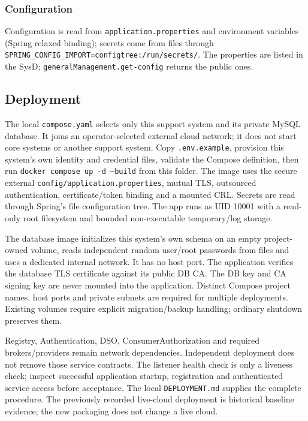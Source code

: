 \documentclass[a4paper]{arrowhead}
\begin{document}
\subsubsection{Configuration}

Configuration is read from \texttt{application.\allowbreak{}properties} and environment variables (Spring relaxed binding); secrets come from files through \texttt{SPRING\_\allowbreak{}CONFIG\_\allowbreak{}IMPORT=\allowbreak{}configtree:\allowbreak{}/\allowbreak{}run/\allowbreak{}secrets/\allowbreak{}}. The properties are listed in the SysD; \texttt{general\allowbreak{}Management.\allowbreak{}get-\allowbreak{}config} returns the public ones.

\subsection{Deployment}

The local \texttt{compose.yaml} selects only this support system and its private MySQL database. It joins an operator-selected external cloud network; it does not start core systems or another support system. Copy \texttt{.env.example}, provision this system's own identity and credential files, validate the Compose definition, then run \texttt{docker compose up -d --build} from this folder. The image uses the secure external \texttt{config/application.properties}, mutual TLS, outsourced authentication, certificate/token binding and a mounted CRL. Secrets are read through Spring's file configuration tree. The app runs as UID 10001 with a read-only root filesystem and bounded non-executable temporary/log storage.

The database image initializes this system's own schema on an empty project-owned volume, reads independent random user/root passwords from files and uses a dedicated internal network. It has no host port. The application verifies the database TLS certificate against its public DB CA. The DB key and CA signing key are never mounted into the application. Distinct Compose project names, host ports and private subnets are required for multiple deployments. Existing volumes require explicit migration/backup handling; ordinary shutdown preserves them.

Registry, Authentication, DSO, ConsumerAuthorization and required brokers/providers remain network dependencies. Independent deployment does not remove those service contracts. The listener health check is only a liveness check; inspect successful application startup, registration and authenticated service access before acceptance. The local \texttt{DEPLOYMENT.md} supplies the complete procedure. The previously recorded live-cloud deployment is historical baseline evidence; the new packaging does not change a live cloud.
\end{document}
